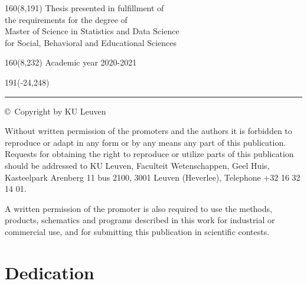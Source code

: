 \documentclass[12pt,a4paper,oneside]{book}
\begin{document}
%
\begin{textblock}{160}(8,191)
\textblockcolour{}
\vspace{-\parskip}
\flushright
Thesis presented in fulfillment of\\[4.5pt]
the requirements for the degree of\\[4.5pt]
Master of Science in Statistics and Data Science\\[4.5pt]
for Social, Behavioral and Educational Sciences
\end{textblock}
%
\begin{textblock}{160}(8,232)
\textblockcolour{}
\vspace{-\parskip}
\flushright
Academic year 2020-2021
\end{textblock}
%
\begin{textblock}{191}(-24,248)
{\color{blueline}\rule{550pt}{5.5pt}}
\end{textblock}
%
\vfill
\newpage
%
\rmfamily
\setcounter{page}{0}
\stackMath
%
%
\thispagestyle{empty}
\setlength{\parindent}{0cm}
\vspace*{\fill}
%
\copyright\ Copyright by KU Leuven \par
Without written permission of the promoters and the authors it is forbidden to reproduce or adapt in any form or by any means any part of this publication. Requests for obtaining the right to reproduce or utilize parts of this publication should be addressed to KU Leuven, Faculteit Wetenschappen, Geel Huis, Kasteelpark Arenberg 11 bus 2100, 3001 Leuven (Heverlee), Telephone +32 16 32 14 01. 

A written permission of the promoter is also required to use the methods, products, schematics and programs described in this work for industrial or commercial use, and for submitting this publication in scientific contests. 
%
\setlength{\parindent}{0.5cm}
%
\chapter*{Dedication}
\end{document}
